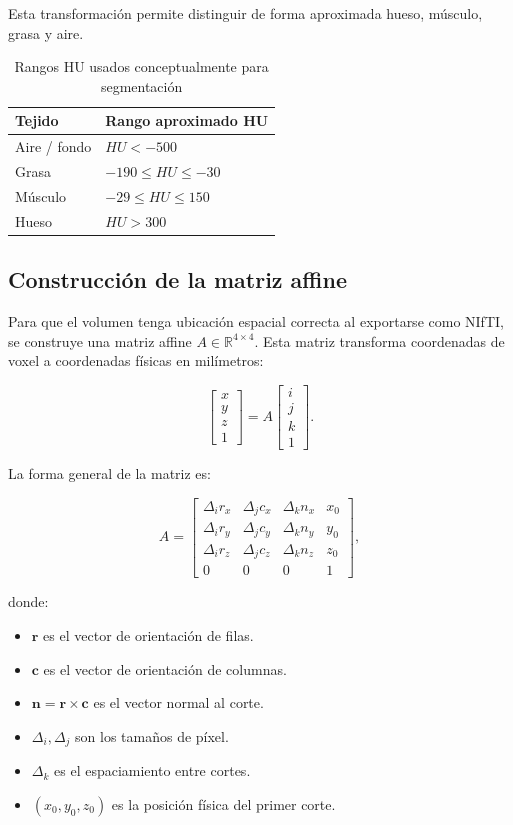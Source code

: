 \documentclass[12pt,a4paper]{article}
\begin{document}
Esta transformación permite distinguir de forma aproximada hueso, músculo, grasa y aire.

\begin{table}[H]
\centering
\caption{Rangos HU usados conceptualmente para segmentación}
\begin{tabular}{ll}
\toprule
Tejido & Rango aproximado HU \\
\midrule
Aire / fondo & \(HU < -500\) \\
Grasa & \(-190 \leq HU \leq -30\) \\
Músculo & \(-29 \leq HU \leq 150\) \\
Hueso & \(HU > 300\) \\
\bottomrule
\end{tabular}
\end{table}

\subsection{Construcción de la matriz affine}

Para que el volumen tenga ubicación espacial correcta al exportarse como NIfTI, se construye una matriz affine \(A\in\mathbb{R}^{4\times4}\). Esta matriz transforma coordenadas de voxel a coordenadas físicas en milímetros:

\[
\begin{bmatrix}
x\\y\\z\\1
\end{bmatrix}
=
A
\begin{bmatrix}
i\\j\\k\\1
\end{bmatrix}.
\]

La forma general de la matriz es:

\[
A =
\begin{bmatrix}
\Delta_i r_x & \Delta_j c_x & \Delta_k n_x & x_0 \\
\Delta_i r_y & \Delta_j c_y & \Delta_k n_y & y_0 \\
\Delta_i r_z & \Delta_j c_z & \Delta_k n_z & z_0 \\
0 & 0 & 0 & 1
\end{bmatrix},
\]

donde:

\begin{itemize}
    \item \(\mathbf{r}\) es el vector de orientación de filas.
    \item \(\mathbf{c}\) es el vector de orientación de columnas.
    \item \(\mathbf{n}=\mathbf{r}\times\mathbf{c}\) es el vector normal al corte.
    \item \(\Delta_i,\Delta_j\) son los tamaños de píxel.
    \item \(\Delta_k\) es el espaciamiento entre cortes.
    \item \((x_0,y_0,z_0)\) es la posición física del primer corte.
\end{itemize}
\end{document}
